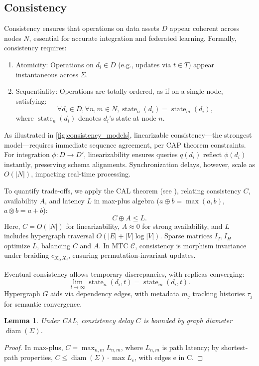 \documentclass{amsart}
\newtheorem{lem}{Lemma}
\DeclareMathOperator\state{state}
\DeclareMathOperator\diam{diam}
\begin{document}
\subsection{Consistency} \label{subsubsec:consistency}
Consistency ensures that operations on data assets \( D \) appear coherent across nodes \( N \), essential for accurate integration and federated learning. Formally, consistency requires:
\begin{enumerate}
    \item Atomicity: Operations on \( d_i \in D \) (e.g., updates via \( t \in T \)) appear instantaneous across \( \Sigma \).
    \item Sequentiality: Operations are totally ordered, as if on a single node, satisfying:
    \[
    \forall d_i \in D, \forall n, m \in N, \state_n(d_i) = \state_m(d_i),
    \]
    where \( \state_n(d_i) \) denotes \( d_i \)'s state at node \( n \).
\end{enumerate}
As illustrated in \cref{fig:consistency_models}, linearizable consistency—the strongest model—requires immediate sequence agreement, per CAP theorem constraints. For integration \( \phi: D \to D' \), linearizability ensures queries \( q(d_i) \) reflect \( \phi(d_i) \) instantly, preserving schema alignments. Synchronization delays, however, scale as \( O(|N|) \), impacting real-time processing.

To quantify trade-offs, we apply the CAL theorem   (see  \cite{Lee2023}), relating consistency \( C \), availability \( A \), and latency \( L \) in max-plus algebra (\( a \oplus b = \max(a,b) \), \( a \otimes b = a + b \)):
\[
C \oplus A \leq L.
\]
Here, \( C = O(|N|) \) for linearizability, \( A \approx 0 \) for strong availability, and \( L \) includes hypergraph traversal \( O(|E| + |V| \log |V|) \). Sparse matrices \( I_T, I_H \) optimize \( L \), balancing \( C \) and \( A \). In MTC \( \mathcal{C} \), consistency is morphism invariance under braiding \( c_{X_i, X_j} \), ensuring permutation-invariant updates.

Eventual consistency allows temporary discrepancies, with replicas converging:
\[
\lim_{t \to \infty} \state_n(d_i, t) = \state_m(d_i, t).
\]
Hypergraph \( G \) aids via dependency edges, with metadata \( m_j \) tracking histories \( \tau_j \) for semantic convergence.

\begin{lem} \label{lem:consistency_bound}
Under CAL, consistency delay \( C \) is bounded by graph diameter \( \diam(\Sigma) \).
\end{lem}
\begin{proof}
In max-plus, \( C = \max_{n,m} L_{n,m} \), where \( L_{n,m} \) is path latency; by shortest-path properties, \( C \leq \diam(\Sigma) \cdot \max L_e \), with edges e in C.
\end{proof}
\end{document}
